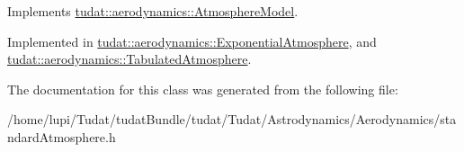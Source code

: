 Implements \hyperlink{classtudat_1_1aerodynamics_1_1AtmosphereModel_a9b6be6472481354320e2869e586be5ca}{tudat\+::aerodynamics\+::\+Atmosphere\+Model}.



Implemented in \hyperlink{classtudat_1_1aerodynamics_1_1ExponentialAtmosphere_aa486d36c2fbe56026d7a4cc17f7d04a2}{tudat\+::aerodynamics\+::\+Exponential\+Atmosphere}, and \hyperlink{classtudat_1_1aerodynamics_1_1TabulatedAtmosphere_afdf6a072bd4c4d876ba2323f5955b441}{tudat\+::aerodynamics\+::\+Tabulated\+Atmosphere}.



The documentation for this class was generated from the following file\+:\begin{DoxyCompactItemize}
\item 
/home/lupi/\+Tudat/tudat\+Bundle/tudat/\+Tudat/\+Astrodynamics/\+Aerodynamics/standard\+Atmosphere.\+h\end{DoxyCompactItemize}
